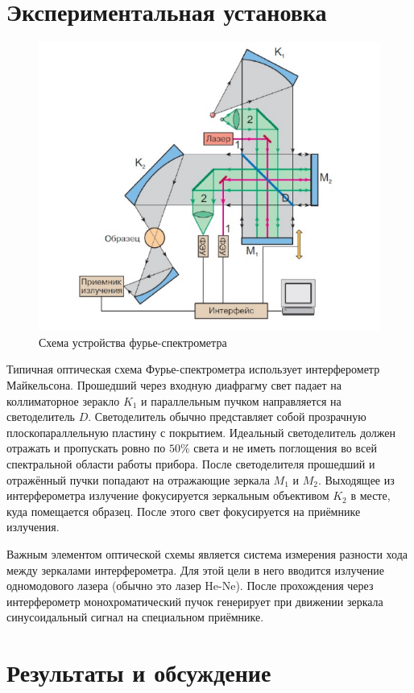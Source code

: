 \documentclass{article}
\begin{document}
\section{Экспериментальная установка}\;
\begin{figure} [h!]
    \centering
    \includegraphics[width=0.5\linewidth]{прибор.png}
    \caption{Схема устройства фурье-спектрометра}
    \label{экспериментальная установка}
\end{figure}
\par Типичная оптическая схема Фурье-спектрометра использует интерферометр Майкельсона. Прошедший через входную диафрагму свет падает на коллиматорное зеракло $K_1$ и параллельным пучком направляется на светоделитель $D$.
Светоделитель обычно представляет собой прозрачную плоскопараллельную пластину с покрытием. Идеальный светоделитель должен отражать и пропускать ровно по $50\%$ света и не иметь поглощения во всей спектральной области
работы прибора. После светоделителя прошедший и отражённый пучки попадают на отражающие зеркала $M_1$ и $M_2$. Выходящее из интерферометра излучение фокусируется зеркальным
объективом $K_2$ в месте, куда помещается образец. После этого свет фокусируется на приёмнике излучения.
\par
Важным элементом оптической схемы является система измерения разности хода между
зеркалами интерферометра. Для этой цели в него вводится излучение одномодового лазера
(обычно это лазер He-Ne). После прохождения через интерферометр монохроматический пучок генерирует при движении зеркала синусоидальный сигнал на специальном приёмнике.
\section{Результаты и обсуждение}
\end{document}
